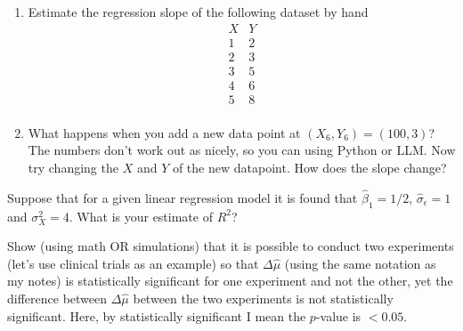 \begin{exercise}
\begin{enumerate}
\item  Estimate the regression slope of the following dataset by hand 
\[
\begin{array}{c|c}
X & Y \\\hline
1 & 2 \\
2 & 3 \\
3 & 5 \\
4 & 6 \\
5 & 8 \\
\end{array}
\]
\item What happens when you add a new data point at $(X_6,Y_6) = (100,3)$? The numbers don't work out as nicely, so you can using Python or LLM. Now try changing the $X$ and $Y$ of the new datapoint. How does the slope change? 
\end{enumerate}

\end{exercise} 

\begin{exercise}
Suppose that for a given linear regression model it is found that $\hat{\beta}_1 = 1/2$, $\hat{\sigma}_{\epsilon} = 1$ and $\sigma_X^2 = 4$. What is your estimate of $R^2$? 
\end{exercise}




\begin{exercise}
Show (using math OR simulations) that it is possible to conduct two experiments (let's use clinical trials as an example) so that $\Delta \hat{\mu}$ (using the same notation as my notes) is statistically significant for one experiment and not the other, yet the difference between $\Delta \hat{\mu}$ between the two experiments is not statistically significant.  Here, by statistically significant I mean the $p$-value is $<0.05$. 
\end{exercise}

